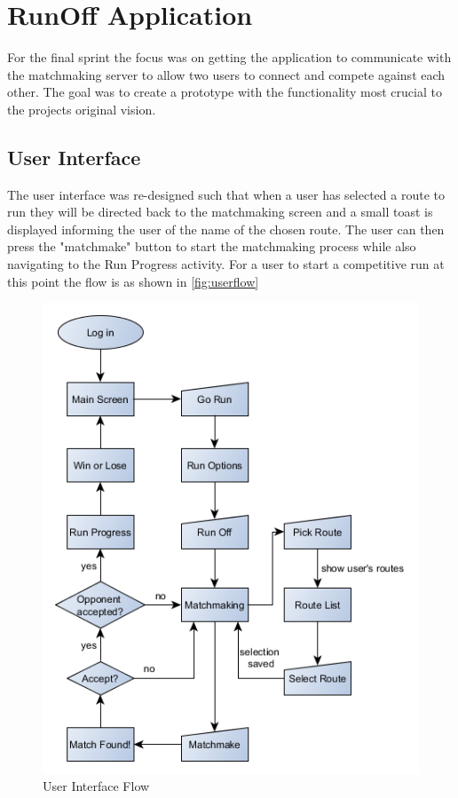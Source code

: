 \section{RunOff Application}
For the final sprint the focus was on getting the application to communicate with the matchmaking server to allow two users to connect and compete against each other. The goal was to create a prototype with the functionality most crucial to the projects original vision.

\subsection{User Interface} 
The user interface was re-designed such that when a user has selected a route to run they will be directed back to the matchmaking screen and a small toast is displayed informing the user of the name of the chosen route. The user can then press the "matchmake" button to start the matchmaking process while also navigating to the Run Progress activity. For a user to start a competitive run at this point the flow is as shown in \autoref{fig:userflow}

\begin{figure}[ht]
\begin{center}
 \caption{User Interface Flow}
 \label{fig:userflow}
 \includegraphics[scale=0.7]{img/runappflow.png}
\end{center}
\end{figure}

